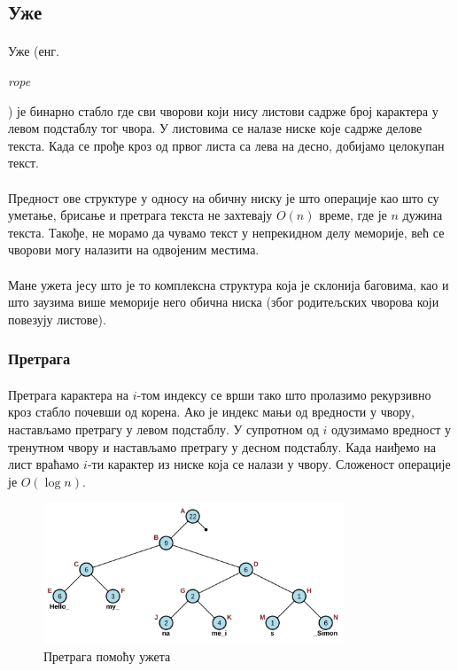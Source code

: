 \documentclass[12pt,oneside]{memoir}
\begin{document}
\subsection{Уже}
\paragraph{}
Уже (енг. \begin{latinica}\textit{rope}\end{latinica}) је бинарно стабло где сви чворови који нису
листови садрже број карактера у левом подстаблу тог чвора. У листовима се налазе ниске које 
садрже делове текста. Када се прође кроз од првог листа са лева на десно, добијамо целокупан
текст.

\paragraph{}
Предност ове структуре у односу на обичну ниску је што операције као што су уметање, брисање
и претрага текста не захтевају \(O(n)\) време, где је \(n\) дужина текста. Такође, не морамо
да чувамо текст у непрекидном делу меморије, већ се чворови могу налазити на одвојеним местима.

\paragraph{}
Мане ужета јесу што је то комплексна структура која је склонија баговима, као и што заузима
више меморије него обична ниска (због родитељских чворова који повезују листове).

\subsubsection{Претрага}
\paragraph{}
Претрага карактера на \(i\)-том  индексу се врши тако што пролазимо рекурзивно кроз стабло 
почевши од корена. Ако је индекс мањи од вредности у чвору, настављамо претрагу у левом 
подстаблу. У супротном од \(i\) одузимамо вредност у тренутном чвору и настављамо претрагу у
десном подстаблу. Када наиђемо на лист враћамо \(i\)-ти карактер из ниске која се налази
у чвору. Сложеност операције је \(O(\log{}n)\).

\begin{figure}
  \centering
  \includegraphics[width=0.8\textwidth]{images/rope_search.png}
  \caption{Претрага помоћу ужета}
  \label{fig:ropesearch}
\end{figure}
\end{document}
